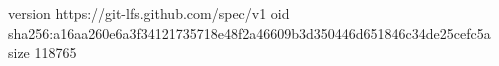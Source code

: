 version https://git-lfs.github.com/spec/v1
oid sha256:a16aa260e6a3f34121735718e48f2a46609b3d350446d651846c34de25cefc5a
size 118765
